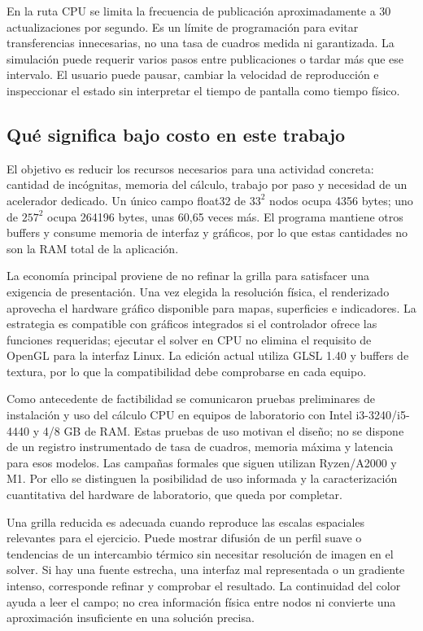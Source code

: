 \documentclass[11pt,a4paper]{article}
\begin{document}
En la ruta CPU se limita la frecuencia de publicación aproximadamente a 30 actualizaciones por segundo. Es un límite de programación para evitar transferencias innecesarias, no una tasa de cuadros medida ni garantizada. La simulación puede requerir varios pasos entre publicaciones o tardar más que ese intervalo. El usuario puede pausar, cambiar la velocidad de reproducción e inspeccionar el estado sin interpretar el tiempo de pantalla como tiempo físico.

\subsection{Qué significa bajo costo en este trabajo}
El objetivo es reducir los recursos necesarios para una actividad concreta: cantidad de incógnitas, memoria del cálculo, trabajo por paso y necesidad de un acelerador dedicado. Un único campo float32 de $33^2$ nodos ocupa 4356 bytes; uno de $257^2$ ocupa 264196 bytes, unas 60,65 veces más. El programa mantiene otros buffers y consume memoria de interfaz y gráficos, por lo que estas cantidades no son la RAM total de la aplicación.

La economía principal proviene de no refinar la grilla para satisfacer una exigencia de presentación. Una vez elegida la resolución física, el renderizado aprovecha el hardware gráfico disponible para mapas, superficies e indicadores. La estrategia es compatible con gráficos integrados si el controlador ofrece las funciones requeridas; ejecutar el solver en CPU no elimina el requisito de OpenGL para la interfaz Linux. La edición actual utiliza GLSL 1.40 y buffers de textura, por lo que la compatibilidad debe comprobarse en cada equipo.

Como antecedente de factibilidad se comunicaron pruebas preliminares de instalación y uso del cálculo CPU en equipos de laboratorio con Intel i3-3240/i5-4440 y 4/8 GB de RAM. Estas pruebas de uso motivan el diseño; no se dispone de un registro instrumentado de tasa de cuadros, memoria máxima y latencia para esos modelos. Las campañas formales que siguen utilizan Ryzen/A2000 y M1. Por ello se distinguen la posibilidad de uso informada y la caracterización cuantitativa del hardware de laboratorio, que queda por completar.

Una grilla reducida es adecuada cuando reproduce las escalas espaciales relevantes para el ejercicio. Puede mostrar difusión de un perfil suave o tendencias de un intercambio térmico sin necesitar resolución de imagen en el solver. Si hay una fuente estrecha, una interfaz mal representada o un gradiente intenso, corresponde refinar y comprobar el resultado. La continuidad del color ayuda a leer el campo; no crea información física entre nodos ni convierte una aproximación insuficiente en una solución precisa.
\end{document}
